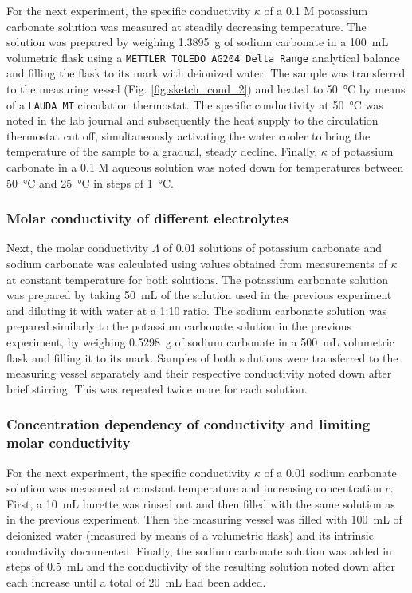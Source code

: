 For the next experiment, the specific conductivity $\kappa$ of a 0.1 M potassium carbonate solution was measured at steadily decreasing temperature. 
The solution was prepared by weighing \qty[round-precision=5]{1.3895}{\gram} of sodium carbonate in a \qty{100}{\milli\liter} volumetric flask using a \texttt{METTLER TOLEDO AG204 Delta Range} analytical balance and filling the flask to its mark with deionized water. 
The sample was transferred to the measuring vessel (Fig. \ref{fig:sketch_cond_2}) and heated to \qty{50}{\celsius} by means of a \texttt{LAUDA MT} circulation thermostat. The specific conductivity at \qty{50}{\celsius} was noted in the lab journal and subsequently the heat supply to the circulation thermostat cut off, simultaneously activating the water cooler to bring the temperature of the sample to a gradual, steady decline. 
Finally, $\kappa$ of potassium carbonate in a 0.1 M aqueous solution was noted down for temperatures between \qty{50} {\celsius} and \qty{25}{\celsius} in steps of \qty{1}{\celsius}.



\subsubsection{Molar conductivity of different electrolytes} 

Next, the molar conductivity $\Lambda$ of \qty{0.01}{\M} solutions of potassium carbonate and sodium carbonate was calculated using values obtained from measurements of $\kappa$ at constant temperature for both solutions. 
The potassium carbonate solution was prepared by taking \qty{50}{\milli\liter} of the solution used in the previous experiment and diluting it with water at a 1:10 ratio. 
The sodium carbonate solution was prepared similarly to the potassium carbonate solution in the previous experiment, by weighing \qty{0.5298}{\gram} of sodium carbonate in a \qty{500}{\milli\liter} volumetric flask and filling it to its mark.
Samples of both solutions were transferred to the measuring vessel separately and their respective conductivity noted down after brief stirring. This was repeated twice more for each solution.

\subsubsection{Concentration dependency of conductivity and limiting molar conductivity}

For the next experiment, the specific conductivity $\kappa$ of a \qty{0.01}{\M} sodium carbonate solution was measured at constant temperature and increasing concentration $c$. 
First, a \qty{10}{\milli\liter} burette was rinsed out and then filled with the same solution as in the previous experiment. Then the measuring vessel was filled with \qty{100}{\milli\liter} of deionized water (measured by means of a volumetric flask) and its intrinsic conductivity documented. Finally, the sodium carbonate solution was added in steps of \qty{0.5}{\milli\liter} and the conductivity of the resulting solution noted down after each increase until a total of \qty{20}{\milli\liter} had been added. 

